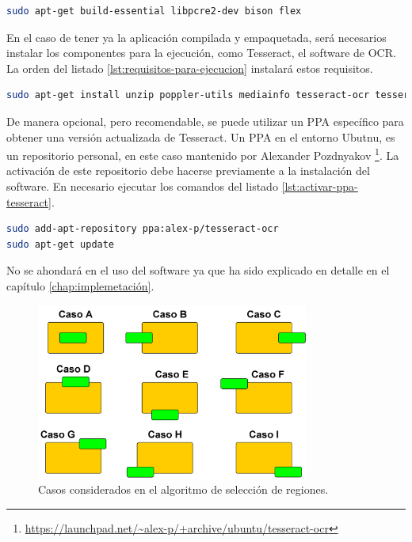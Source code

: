 \begin{lstlisting}[language=bash,caption={Dependencias para la compilación.},label=lst:requisitos-para-compilacion]
sudo apt-get build-essential libpcre2-dev bison flex
\end{lstlisting}

En el caso de tener ya la aplicación compilada y empaquetada, será necesarios instalar los componentes para la ejecución, como Tesseract, el software de OCR. La orden del listado \ref{lst:requisitos-para-ejecucion} instalará estos requisitos.

\begin{lstlisting}[language=bash,caption={Dependencias para la ejecución.},label=lst:requisitos-para-ejecucion]
sudo apt-get install unzip poppler-utils mediainfo tesseract-ocr tesseract-ocr-spa jq python3-opencv jq bc
\end{lstlisting}

De manera opcional, pero recomendable, se puede utilizar un PPA específico para obtener una versión actualizada de Tesseract. Un PPA en el entorno Ubutnu, es un repositorio personal, en este caso mantenido por Alexander Pozdnyakov \footnote{\url{https://launchpad.net/~alex-p/+archive/ubuntu/tesseract-ocr}}. La activación de este repositorio debe hacerse previamente a la instalación del software. En necesario ejecutar los comandos del listado \ref{lst:activar-ppa-tesseract}.

\begin{lstlisting}[language=bash,caption={Activar PPA de Tesseract.},label=lst:activar-ppa-tesseract]
sudo add-apt-repository ppa:alex-p/tesseract-ocr
sudo apt-get update
\end{lstlisting}

No se ahondará en el uso del software ya que ha sido explicado en detalle en el capítulo \ref{chap:implemetación}.

\begin{figure}[hp!]
    \centering
    \includegraphics[width=0.8\textwidth]{imaxes/z-adicional/casos-algoritmo-seleccion-regiones.png}
    \caption{Casos considerados en el algoritmo de selección de regiones.}
    \label{fig:casos-algoritmo-seleccion-regiones}
\end{figure}